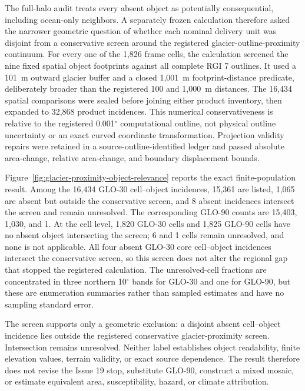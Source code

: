 \documentclass[11pt]{article}
\begin{document}
The full-halo audit treats every absent object as potentially consequential,
including ocean-only neighbors. A separately frozen calculation therefore
asked the narrower geometric question of whether each nominal delivery unit
was disjoint from a conservative screen around the registered
glacier-outline-proximity continuum. For every one of the 1,826 frame cells,
the calculation screened the nine fixed spatial object footprints against all
complete RGI 7 outlines. It used a 101~m outward glacier buffer and a closed
1,001~m footprint-distance predicate, deliberately broader than the registered
100 and 1,000~m distances. The 16,434 spatial comparisons were sealed before
joining either product inventory, then expanded to 32,868 product incidences.
This numerical conservativeness is relative to the registered 0.001$^\circ$
computational outline, not physical outline uncertainty or an exact curved
coordinate transformation.
Projection validity repairs were retained in a source-outline-identified
ledger and passed absolute area-change, relative area-change, and boundary
displacement bounds.

Figure~\ref{fig:glacier-proximity-object-relevance} reports the exact
finite-population result. Among the 16,434 GLO-30 cell--object incidences,
15,361 are listed, 1,065 are absent but outside the conservative screen, and 8
absent incidences intersect the screen and remain unresolved. The corresponding
GLO-90 counts are 15,403, 1,030, and 1. At the cell level, 1,820 GLO-30 cells
and 1,825 GLO-90 cells have no absent object intersecting the screen; 6 and 1
cells remain unresolved, and none is not applicable. All four absent GLO-30
core cell--object incidences intersect the conservative screen, so this screen
does not alter the regional gap that stopped the registered calculation. The unresolved-cell
fractions are concentrated in three northern 10$^\circ$ bands for GLO-30 and
one for GLO-90, but these are enumeration summaries rather than sampled
estimates and have no sampling standard error.

The screen supports only a geometric exclusion: a disjoint absent cell--object
incidence lies outside the registered conservative glacier-proximity screen.
Intersection remains unresolved. Neither label establishes object readability,
finite elevation values, terrain validity, or exact source dependence. The
result therefore does not revise the Issue 19 stop, substitute GLO-90,
construct a mixed mosaic, or estimate equivalent area, susceptibility, hazard,
or climate attribution.
\end{document}
